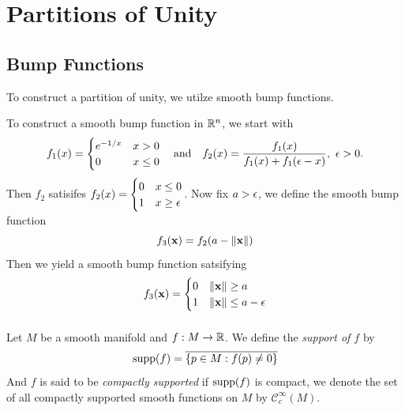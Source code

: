 \section[Partitions of Unity]{Partitions of Unity}

\subsection*{Bump Functions}

To construct a partition of unity, we utilze smooth bump functions.
\begin{example}
  To construct a smooth bump function in \(\mathbb{R}^n\), we start with \[
    f_1(x) = \begin{cases}
      e^{-1/x} & x > 0 \\
      0 & x \leq 0
    \end{cases}
    \quad\text{and}\quad
    f_2(x) = \frac{f_1(x)}{f_1(x) + f_1(\epsilon-x)},\ \epsilon > 0.
  \]
  \[
    
    \qquad
    
  \]
  Then \(f_2\) satisifes \(
    f_2(x) = \begin{cases}
      0 & x \leq 0 \\
      1 & x \geq \epsilon
    \end{cases}
  \). Now fix \(a > \epsilon\), we define the smooth bump function \[
    f_3(\mathbf{x})
    = f_2(a - \|\mathbf{x}\|)
  \]
  Then we yield a smooth bump function satsifying
  \[
    f_3(\mathbf{x}) = \begin{cases}
      0 & \|\mathbf{x}\| \geq a \\
      1 & \|\mathbf{x}\| \leq a - \epsilon
    \end{cases}
   \]
   \[
    
  \]
\end{example}

\begin{definition}
  Let \(M\) be a smooth manifold and \(f:M\to\mathbb{R}\). We define the \emph{support of \(f\)} by \[
    \operatorname{supp}(f) = \overline{\{p \in M : f(p) \neq 0\}}
  \]
  And \(f\) is said to be \emph{compactly supported} if \(\operatorname{supp}(f)\) is compact, we denote the set of all compactly supported smooth functions on \(M\) by \(\mathcal{C}_c^\infty(M)\).
\end{definition}

